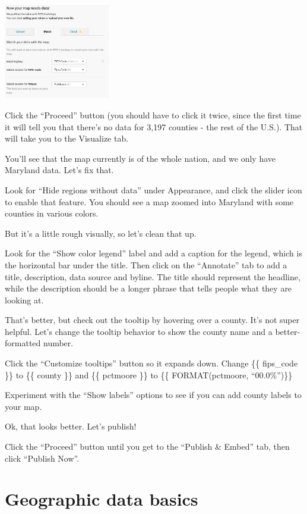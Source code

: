\documentclass[
  letterpaper,
  DIV=11,
  numbers=noendperiod]{scrreprt}
\begin{document}
\includegraphics[width=1.83in,height=\textheight]{./images/datawrapper8.png}

Click the ``Proceed'' button (you should have to click it twice, since
the first time it will tell you that there's no data for 3,197 counties
- the rest of the U.S.). That will take you to the Visualize tab.

You'll see that the map currently is of the whole nation, and we only
have Maryland data. Let's fix that.

Look for ``Hide regions without data'' under Appearance, and click the
slider icon to enable that feature. You should see a map zoomed into
Maryland with some counties in various colors.

But it's a little rough visually, so let's clean that up.

Look for the ``Show color legend'' label and add a caption for the
legend, which is the horizontal bar under the title. Then click on the
``Annotate'' tab to add a title, description, data source and byline.
The title should represent the headline, while the description should be
a longer phrase that tells people what they are looking at.

That's better, but check out the tooltip by hovering over a county. It's
not super helpful. Let's change the tooltip behavior to show the county
name and a better-formatted number.

Click the ``Customize tooltips'' button so it expands down. Change \{\{
fips\_code \}\} to \{\{ county \}\} and \{\{ pctmoore \}\} to \{\{
FORMAT(pctmoore, ``00.0\%'')\}\}

Experiment with the ``Show labels'' options to see if you can add county
labels to your map.

Ok, that looks better. Let's publish!

Click the ``Proceed'' button until you get to the ``Publish \& Embed''
tab, then click ``Publish Now''.


\hypertarget{geographic-data-basics}{%
\chapter{Geographic data basics}\label{geographic-data-basics}}
\end{document}
